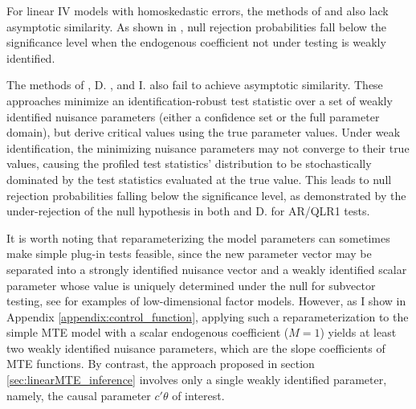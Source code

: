 \documentclass[11pt]{article}
\theoremstyle{definition}
\newcommand{\0}{\ensuremath{\mathbf{0}}}
\begin{document}
\begin{bibunit}
For linear IV models with homoskedastic errors, the methods of \cite{gkmc:2012} and \cite{gkm:2019} also lack asymptotic similarity. As shown in \citet[Figure 4]{gkm:2019}, null rejection probabilities fall below the significance level when the endogenous coefficient not under testing is weakly identified.

The methods of \cite{chaudhuri/zivot:2011}, D. \cite{andrews.d:2017}, and I. \cite{andrews.i:2018} also fail to achieve asymptotic similarity. These approaches minimize an identification-robust test statistic over a set of weakly identified nuisance parameters (either a confidence set or the full parameter domain), but derive critical values using the true parameter values. Under weak identification, the minimizing nuisance parameters may not converge to their true values, causing the profiled test statistics' distribution to be stochastically dominated by the test statistics evaluated at the true value. This leads to null rejection probabilities falling below the significance level, as demonstrated by the under-rejection of the null hypothesis in both \citet[Table 2]{chaudhuri/zivot:2011} and D. \citet[Table I]{andrews.d:2017} for AR/QLR1 tests.

It is worth noting that reparameterizing the model parameters can sometimes make simple plug-in tests feasible, since the new parameter vector may be separated into a strongly identified nuisance vector and a weakly identified scalar parameter whose value is uniquely determined under the null for subvector testing, see \cite{cox:2024} for examples of low-dimensional factor models. However, as I show in Appendix \ref{appendix:control_function}, applying such a reparameterization to the simple MTE model with a scalar endogenous coefficient ($M=1$) yields at least two weakly identified nuisance parameters, which are the slope coefficients of MTE functions. By contrast, the approach proposed in section \ref{sec:linearMTE_inference} involves only a single weakly identified parameter, namely, the causal parameter $c'\theta$ of interest.


\end{bibunit}
\end{document}
